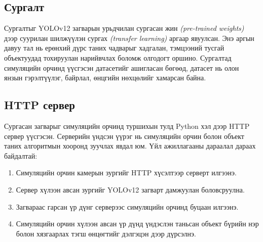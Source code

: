 \subsection{Сургалт}

Сургалтыг YOLOv12 загварын урьдчилан сургасан жин \textit{(pre-trained weights)} дээр суурилан шилжүүлэн сургах \textit{(transfer learning)} аргаар явуулсан. Энэ аргын давуу тал нь ерөнхий дүрс таних чадварыг хадгалан, тэмцээний тусгай объектуудад тохируулан нарийвчлах боломж олгодогт оршино. Сургалтад симуляцийн орчинд үүсгэсэн датасетийг ашигласан бөгөөд, датасет нь олон янзын гэрэлтүүлэг, байрлал, өнцгийн нөхцөлийг хамарсан байна.

\subsection{HTTP сервер}

Сургасан загварыг симуляцийн орчинд туршихын тулд Python хэл дээр HTTP сервер үүсгэсэн. Серверийн үндсэн үүрэг нь симуляцийн орчин болон объект таних алгоритмын хооронд зуучлах явдал юм. Үйл ажиллагааны дараалал дараах байдалтай:

\begin{enumerate}
    \item Симуляцийн орчин камерын зургийг HTTP хүсэлтээр серверт илгээнэ.
    \item Сервер хүлээн авсан зургийг YOLOv12 загварт дамжуулан боловсруулна.
    \item Загвараас гарсан үр дүнг серверээс симуляцийн орчинд буцаан илгээнэ.
    \item Симуляцийн орчин хүлээн авсан үр дүнд үндэслэн таньсан объект бүрийн нэр болон хязгаарлах тэгш өнцөгтийг дэлгэцэн дээр дүрсэлнэ.
\end{enumerate}

